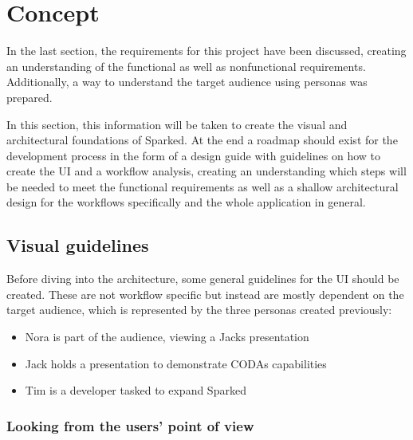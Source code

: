 \chapter{Concept}


In the last section, the requirements for this project have been discussed, creating an understanding of the functional as well as nonfunctional requirements. Additionally, a way to understand the target audience using personas was prepared. 

In this section, this information will be taken to create the visual and architectural foundations of Sparked. At the end a roadmap should exist for the development process in the form of a design guide with guidelines on how to create the UI and a workflow analysis, creating an understanding which steps will be needed to meet the functional requirements as well as a shallow architectural design for the workflows specifically and the whole application in general.

\section{Visual guidelines}
Before diving into the architecture, some general guidelines for the UI should be created. These are not workflow specific but instead are mostly dependent on the target audience, which is represented by the three personas created previously: 

\begin{itemize}
\item Nora is part of the audience, viewing a Jacks presentation
\item Jack holds a presentation to demonstrate CODAs capabilities
\item Tim is a developer tasked to expand Sparked
\end{itemize}

\subsection{Looking from the users’ point of view}

